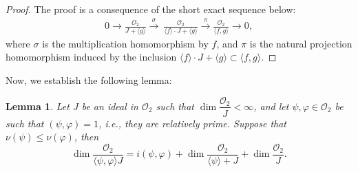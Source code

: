 \documentclass[12pt,letterpaper]{amsart}
\newtheorem{lemma}[theorem]{Lemma}
\begin{document}
\begin{proof}
     The proof is a consequence of the short exact sequence below:
\begin{align*}
0 \longrightarrow \frac{\mathcal{O}_{2}}{J +\langle g \rangle}  \xrightarrow{ \ \sigma  \ } \    \frac{\mathcal{O}_{2}}{\langle f\rangle \cdot J +\langle g\rangle} \xrightarrow{ \ \pi  \ } \frac{\mathcal{O}_{2}}{\langle f ,g \rangle} \longrightarrow 0,
\end{align*}
where $\sigma$ is the multiplication homomorphism by $f$, and $\pi$ is the natural projection homomorphism induced by the inclusion $\langle f\rangle \cdot J +\langle g \rangle \subset \langle f,g \rangle $.
\end{proof}
Now, we establish the following lemma:
\begin{lemma}\label{ca}
  Let $J$ be an ideal in $\mathcal{O}_2$ such that $\dim\dfrac{\mathcal{O}_2}{J}<\infty$, and let $\psi,\varphi\in\mathcal{O}_2$ be such that $(\psi,\varphi)=1$, i.e., they are relatively prime. Suppose that $\nu(\psi)\leq \nu(\varphi)$, then
    \begin{equation}
    \nonumber
        \dim \frac{\mathcal{O}_{2}}{\langle \psi,\varphi\rangle  J }= i(\psi,\varphi)+\dim\frac{\mathcal{O}_{2}}{\langle \psi\rangle+J}+\dim\frac{\mathcal{O}_{2}}{J}.
    \end{equation}  
\end{lemma}
\end{document}
